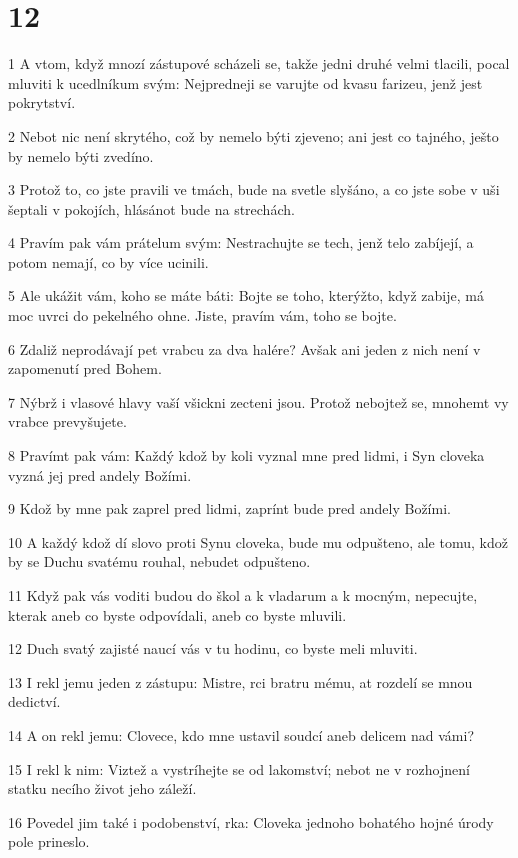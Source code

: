 \chapter{12}

\par 1 A vtom, když mnozí zástupové scházeli se, takže jedni druhé velmi tlacili, pocal mluviti k ucedlníkum svým: Nejpredneji se varujte od kvasu farizeu, jenž jest pokrytství.
\par 2 Nebot nic není skrytého, což by nemelo býti zjeveno; ani jest co tajného, ješto by nemelo býti zvedíno.
\par 3 Protož to, co jste pravili ve tmách, bude na svetle slyšáno, a co jste sobe v uši šeptali v pokojích, hlásánot bude na strechách.
\par 4 Pravím pak vám prátelum svým: Nestrachujte se tech, jenž telo zabíjejí, a potom nemají, co by více ucinili.
\par 5 Ale ukážit vám, koho se máte báti: Bojte se toho, kterýžto, když zabije, má moc uvrci do pekelného ohne. Jiste, pravím vám, toho se bojte.
\par 6 Zdaliž neprodávají pet vrabcu za dva halére? Avšak ani jeden z nich není v zapomenutí pred Bohem.
\par 7 Nýbrž i vlasové hlavy vaší všickni zecteni jsou. Protož nebojtež se, mnohemt vy vrabce prevyšujete.
\par 8 Pravímt pak vám: Každý kdož by koli vyznal mne pred lidmi, i Syn cloveka vyzná jej pred andely Božími.
\par 9 Kdož by mne pak zaprel pred lidmi, zaprínt bude pred andely Božími.
\par 10 A každý kdož dí slovo proti Synu cloveka, bude mu odpušteno, ale tomu, kdož by se Duchu svatému rouhal, nebudet odpušteno.
\par 11 Když pak vás voditi budou do škol a k vladarum a k mocným, nepecujte, kterak aneb co byste odpovídali, aneb co byste mluvili.
\par 12 Duch svatý zajisté naucí vás v tu hodinu, co byste meli mluviti.
\par 13 I rekl jemu jeden z zástupu: Mistre, rci bratru mému, at rozdelí se mnou dedictví.
\par 14 A on rekl jemu: Clovece, kdo mne ustavil soudcí aneb delicem nad vámi?
\par 15 I rekl k nim: Viztež a vystríhejte se od lakomství; nebot ne v rozhojnení statku necího život jeho záleží.
\par 16 Povedel jim také i podobenství, rka: Cloveka jednoho bohatého hojné úrody pole prineslo.

